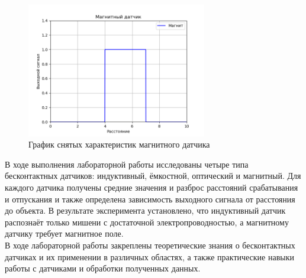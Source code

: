 \documentclass[a4paper]{article}
\begin{document}
\begin{figure}[H]
    \centering
    \includegraphics[width=0.7\textwidth]{plot_4.png}
    \caption{График снятых характеристик магнитного датчика}
    \label{fig:mag}
\end{figure}
В ходе выполнения лабораторной работы исследованы четыре типа бесконтактных датчиков: индуктивный, ёмкостной, оптический и магнитный. Для каждого датчика получены средние значения и разброс расстояний срабатывания и отпускания и также определена зависимость выходного сигнала от расстояния до объекта. В результате эксперимента установлено, что индуктивный датчик распознаёт только мишени с достаточной электропроводностью, а магнитному датчику требует магнитное поле.\\[0.5em]
В ходе лабораторной работы закреплены теоретические знания о бесконтактных датчиках и их применении в различных областях, а также практические навыки работы с датчиками и обработки полученных данных.
\end{document}
